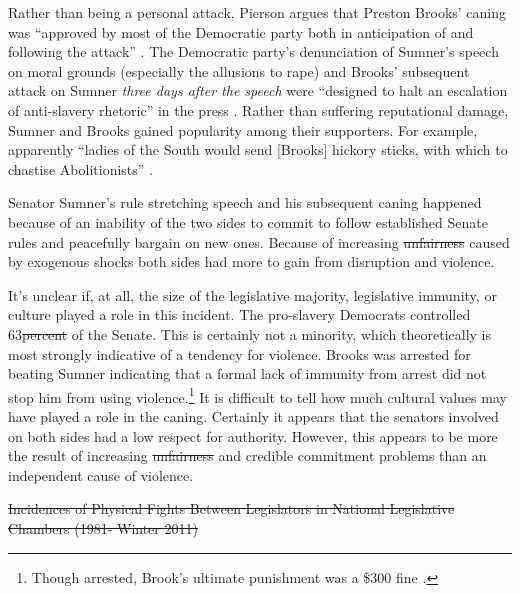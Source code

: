 \documentclass[a4paper]{article}\usepackage[]{graphicx}\usepackage[]{color}
\providecommand{\DIFaddtex}[1]{{\protect\color{blue}\uwave{#1}}} %
\providecommand{\DIFdeltex}[1]{{\protect\color{red}\sout{#1}}}                      %
\providecommand{\DIFaddbegin}{} %
\providecommand{\DIFaddend}{} %
\providecommand{\DIFdelbegin}{} %
\providecommand{\DIFdelend}{} %
\providecommand{\DIFadd}[1]{\texorpdfstring{\DIFaddtex{#1}}{#1}} %
\providecommand{\DIFdel}[1]{\texorpdfstring{\DIFdeltex{#1}}{}} %
\begin{document}
Rather than being a personal attack, Pierson argues that Preston Brooks' caning was ``approved by most of the Democratic party both in anticipation of and following the attack'' \cite[553]{Pierson1995}. The Democratic party's denunciation of Sumner's speech on moral grounds (especially the allusions to rape) and Brooks' subsequent attack on Sumner \emph{three days after the speech} were ``designed to halt an escalation of anti-slavery rhetoric'' in the press \cite[553]{Pierson1995}. Rather than suffering reputational damage, Sumner and Brooks gained popularity among their supporters. For example, apparently ``ladies of the South would send [Brooks] hickory sticks, with which to chastise Abolitionists'' \cite[255]{Donald2009}.

Senator Sumner's rule stretching speech and his subsequent caning happened because of an inability of the two sides to commit to follow established Senate rules and peacefully bargain on new ones. Because of increasing \DIFdelbegin \DIFdel{unfairness }\DIFdelend \DIFaddbegin \DIFadd{disproportionality }\DIFaddend caused by exogenous shocks both sides had more to gain from disruption and violence.

It's unclear if, at all, the size of the legislative majority, legislative immunity, or culture played a role in this incident. The pro-slavery Democrats controlled 63\DIFdelbegin \DIFdel{percent }\DIFdelend \DIFaddbegin \DIFadd{\% }\DIFaddend of the Senate. This is certainly not a minority, which theoretically is most strongly indicative of a tendency for violence. Brooks was arrested for beating Sumner indicating that a formal lack of immunity from arrest did not stop him from using violence.\footnote{Though arrested, Brook's ultimate punishment was a \$300 fine \cite[59]{Wolfe2004}.} It is difficult to tell how much cultural values may have played a role in the caning. Certainly it appears that the senators involved on both sides had a low respect for authority. However, this appears to be more the result of increasing \DIFdelbegin \DIFdel{unfairness }\DIFdelend \DIFaddbegin \DIFadd{disproportionality }\DIFaddend and credible commitment problems than an independent cause of violence.

\DIFdelbegin %
{%
\DIFdel{Incidences of Physical Fights Between Legislators in National Legislative Chambers (1981- Winter 2011)}}
\DIFdelend \DIFaddbegin \vspace{0.5cm}
\DIFaddend 
\end{document}
